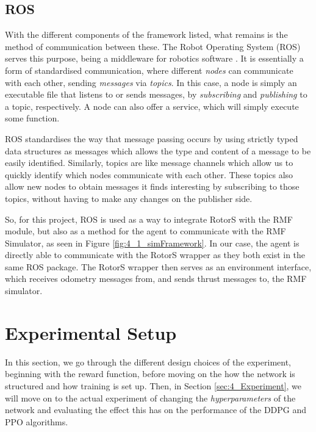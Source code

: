 \subsection{ROS}
With the different components of the framework listed, what remains is the method of communication between these. The Robot Operating System (ROS) serves this purpose, being a middleware for robotics software \cite{ROS}. It is essentially a form of standardised communication, where different \textit{nodes} can communicate with each other, sending \textit{messages} via \textit{topics}. In this case, a node is simply an executable file that listens to or sends messages, by \textit{subscribing} and \textit{publishing} to a topic, respectively. A node can also offer a service, which will simply execute some function. 

ROS standardises the way that message passing occurs by using strictly typed data structures as messages which allows the type and content of a message to be easily identified. Similarly, topics are like message channels which allow us to quickly identify which nodes communicate with each other. These topics also allow new nodes to obtain messages it finds interesting by subscribing to those topics, without having to make any changes on the publisher side.

So, for this project, ROS is used as a way to integrate RotorS with the RMF module, but also as a method for the agent to communicate with the RMF Simulator, as seen in Figure \ref{fig:4_1_simFramework}.
In our case, the agent is directly able to communicate with the RotorS wrapper as they both exist in the same ROS package. 
The RotorS wrapper then serves as an environment interface, which receives odometry messages from, and sends thrust messages to, the RMF simulator.



\section{Experimental Setup}
\label{sec:4_5_experimentalSetup}

In this section, we go through the different design choices of the experiment, beginning with the reward function, before moving on the how the network is structured and how training is set up. Then, in Section \ref{sec:4_Experiment}, we will move on to the actual experiment of changing the \textit{hyperparameters} of the network and evaluating the effect this has on the performance of the DDPG and PPO algorithms.

